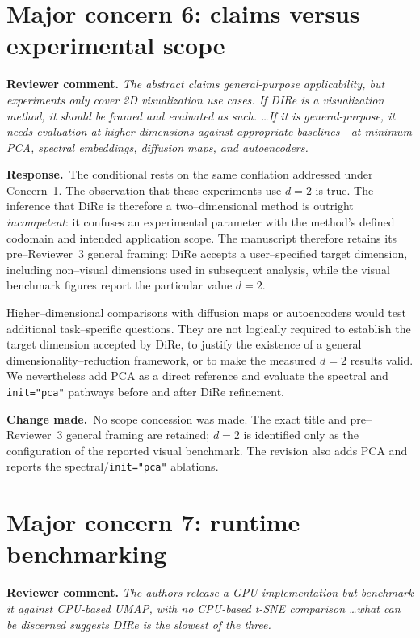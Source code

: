 \documentclass[11pt]{article}
\newcommand{\reviewcomment}[1]{%
  \medskip\noindent\textbf{Reviewer comment.} \emph{#1}\par\smallskip}
\newcommand{\response}{%
  \noindent\textcolor{responseblue}{\textbf{Response.}}\ }
\newcommand{\change}{%
  \noindent\textcolor{responseblue}{\textbf{Change made.}}\ }
\begin{document}
\section*{Major concern 6: claims versus experimental scope}

\reviewcomment{The abstract claims general-purpose applicability, but
experiments only cover 2D visualization use cases. If DIRe is a visualization
method, it should be framed and evaluated as such. \ldots If it is
general-purpose, it needs evaluation at higher dimensions against appropriate
baselines---at minimum PCA, spectral embeddings, diffusion maps, and
autoencoders.}

\response The conditional rests on the same conflation addressed under
Concern~1. The observation that these experiments use $d=2$ is true. The
inference that DiRe is therefore a two--dimensional method is outright
\emph{incompetent}: it confuses an experimental parameter with the method's
defined codomain and intended application scope. The manuscript therefore
retains its pre--Reviewer~3 general framing: DiRe accepts a user--specified
target dimension, including non--visual dimensions used in subsequent
analysis, while the visual benchmark figures report the particular value
$d=2$.

Higher--dimensional comparisons with diffusion maps or autoencoders would test
additional task--specific questions. They are not logically required to
establish the target dimension accepted by DiRe, to justify the existence of a
general dimensionality--reduction framework, or to make the measured $d=2$
results valid. We nevertheless add PCA as a direct reference and evaluate the
spectral and \texttt{init="pca"} pathways before and after DiRe refinement.

\change No scope concession was made. The exact title and pre--Reviewer~3
general framing are retained; $d=2$ is identified only as the configuration of
the reported visual benchmark. The revision also adds PCA and reports the
spectral/\texttt{init="pca"} ablations.

\section*{Major concern 7: runtime benchmarking}

\reviewcomment{The authors release a GPU implementation but benchmark it
against CPU-based UMAP, with no CPU-based t-SNE comparison \ldots what can be
discerned suggests DIRe is the slowest of the three.}
\end{document}
